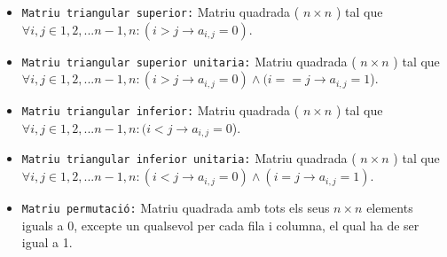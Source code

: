 \documentclass{article}
\begin{document}
    \begin{itemize}
        \item \texttt{Matriu triangular superior:} Matriu quadrada ( $n \times n$ ) tal que $\forall i,j \in {1,2,...n-1,n} : (i > j \rightarrow a_{i,j}=0)$.
        \item \texttt{Matriu triangular superior unitaria:} Matriu quadrada ( $n \times n$ ) tal que $\forall i,j \in {1,2,...n-1,n} : (i > j \rightarrow a_{i,j}=0) \wedge (i == j \rightarrow a_{i,j}=1$). 
        \item \texttt{Matriu triangular inferior:} Matriu quadrada ( $n \times n$ ) tal que $\forall i,j \in {1,2,...n-1,n} : (i < j \rightarrow a_{i,j}=0$). 
        \item \texttt{Matriu triangular inferior unitaria:} Matriu quadrada ( $n \times n$ ) tal que $\forall i,j \in {1,2,...n-1,n} : (i < j \rightarrow a_{i,j}=0) \wedge (i = j \rightarrow a_{i,j}=1)$. 
        \item \texttt{Matriu permutació:} Matriu quadrada amb tots els seus $n \times n$ elements iguals a 0, excepte un qualsevol per cada fila i columna, el qual ha de ser igual a 1.
    \end{itemize}
\end{document}
